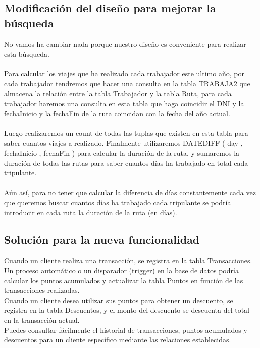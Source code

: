 \documentclass{article}
\begin{document}
\newpage
\subsection{Modificación del diseño para mejorar la búsqueda}
No vamos ha cambiar nada porque nuestro diseño es conveniente para realizar esta búsqueda.\\\\
Para calcular los viajes que ha realizado cada trabajador este ultimo año, por cada trabajador tendremos que hacer una consulta en la tabla TRABAJA2 que almacena la relación entre la tabla Trabajador y la tabla Ruta, para cada trabajador haremos una consulta en esta tabla que haga coincidir el DNI y la fechaInicio y la fechaFin de la ruta coincidan con la fecha del año actual. \\\\
Luego realizaremos un count de todas las tuplas que existen en esta tabla para saber cuantos viajes a realizado. Finalmente utilizaremos DATEDIFF ( day , fechaInicio , fechaFin ) para calcular la duración de la ruta, y sumaremos la duración de todas las rutas para saber cuantos días ha trabajado en total cada tripulante. \\\\
Aún así, para no tener que calcular la diferencia de días constantemente cada vez que queremos buscar cuantos días ha trabajado cada tripulante se podría introducir en cada ruta la duración de la ruta (en días). 
\clearpage
\subsection{Solución para la nueva funcionalidad}

\vspace{0.5cm}

Cuando un cliente realiza una transacción, se registra en la tabla Transacciones.\\

Un proceso automático o un disparador (trigger) en la base de datos podría calcular los puntos acumulados y actualizar la tabla Puntos en función de las transacciones realizadas.\\

Cuando un cliente desea utilizar sus puntos para obtener un descuento, se registra en la tabla Descuentos, y el monto del descuento se descuenta del total en la transacción actual.\\

Puedes consultar fácilmente el historial de transacciones, puntos acumulados y descuentos para un cliente específico mediante las relaciones establecidas.\\
\end{document}
